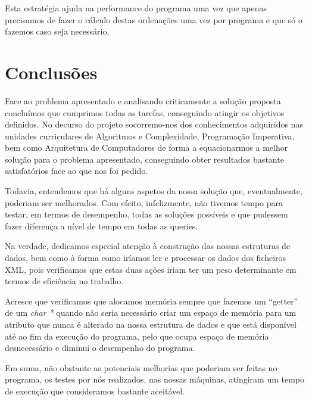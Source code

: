 \documentclass[a4paper]{article}
\begin{document}
Esta estratégia ajuda na performance do programa uma vez que apenas precisamos
de fazer o cálculo destas ordenações uma vez por programa
e que só o fazemos caso seja necessário.


\section{Conclusões}
\label{sec:conclusao}

Face ao problema apresentado e analisando criticamente a solução proposta concluímos
que cumprimos todas as tarefas, conseguindo atingir os objetivos definidos. No decurso
do projeto socorremo-nos dos conhecimentos adquiridos nas unidades curriculares de
Algoritmos e Complexidade, Programação Imperativa, bem como Arquitetura de Computadores
de forma a equacionarmos a melhor solução para o problema apresentado, conseguindo
obter resultados bastante satisfatórios face ao que nos foi pedido. \par
Todavia, entendemos que há alguns aspetos da nossa solução que, eventualmente,
poderiam ser melhorados. Com efeito, infelizmente, não tivemos tempo para testar,
em termos de desempenho, todas as soluções possíveis e que pudessem fazer diferença
a nível de tempo em todas as queries.\par
Na verdade, dedicamos especial atenção à construção das nossas estruturas de dados,
bem como à forma como iríamos ler e processar os dados dos ficheiros XML, pois
verificamos que estas duas ações iriam ter um peso determinante em termos de
eficiência no trabalho. \par
Acresce que verificamos que alocamos memória sempre que fazemos um ``getter'' de um
\textit{char *} quando não seria necessário criar um espaço de memória para um
atributo que nunca é alterado na nossa estrutura de dados e que está disponível
até ao fim da execução do programa, pelo que ocupa espaço de memória desnecessário
e diminui o desempenho do programa. \par
Em suma, não obstante as potenciais melhorias que poderiam ser feitas no
programa, os testes por nós realizados, nas nossas máquinas, atingiram
um tempo de execução que consideramos bastante aceitável.
\end{document}
